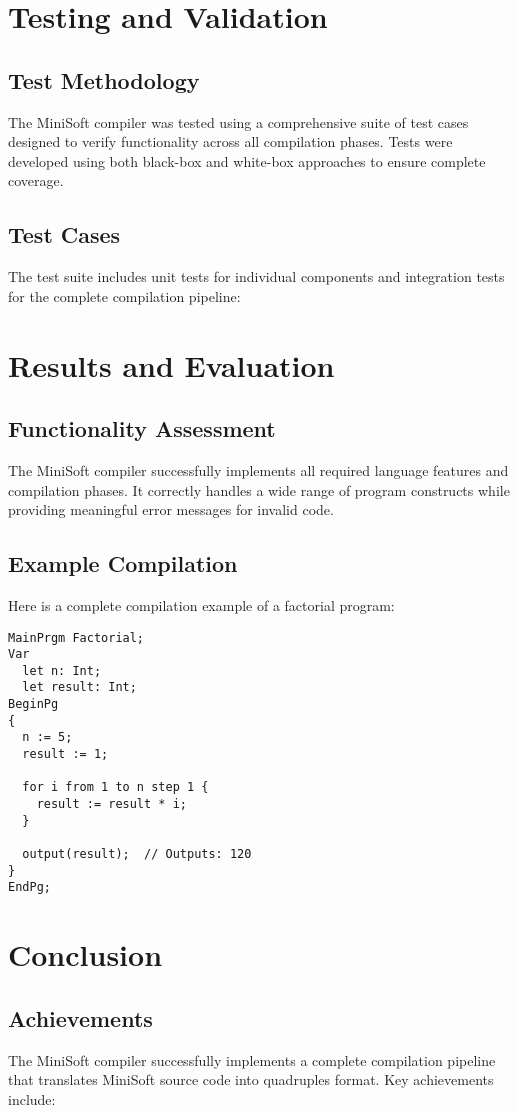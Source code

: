 \documentclass[12pt,a4paper]{article}
\begin{document}
\section{Testing and Validation}
\subsection{Test Methodology}
The MiniSoft compiler was tested using a comprehensive suite of test cases designed to verify functionality across all compilation phases. Tests were developed using both black-box and white-box approaches to ensure complete coverage.
\subsection{Test Cases}
The test suite includes unit tests for individual components and integration tests for the complete compilation pipeline:

\section{Results and Evaluation}
\subsection{Functionality Assessment}
The MiniSoft compiler successfully implements all required language features and compilation phases. It correctly handles a wide range of program constructs while providing meaningful error messages for invalid code.

\subsection{Example Compilation}
Here is a complete compilation example of a factorial program:

\begin{lstlisting}[caption={Sample MiniSoft Program}]
MainPrgm Factorial;
Var
  let n: Int;
  let result: Int;
BeginPg
{
  n := 5;
  result := 1;
  
  for i from 1 to n step 1 {
    result := result * i;
  }
  
  output(result);  // Outputs: 120
}
EndPg;
\end{lstlisting}

\section{Conclusion}
\subsection{Achievements}
The MiniSoft compiler successfully implements a complete compilation pipeline that translates MiniSoft source code into  quadruples format. Key achievements include:
\end{document}
